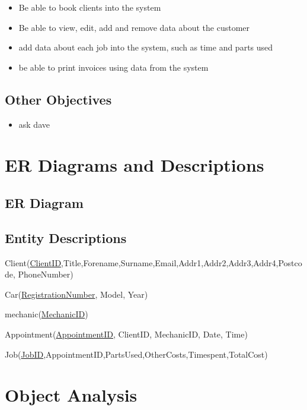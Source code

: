 	\begin{itemize}
	
	\item Be able to book clients into the system
	
	\item Be able to view, edit, add and remove data about the customer
	
	\item add data about each job into the system, such as time and parts used
	
	\item be able to print invoices	using data from the system 
	
	\end{itemize}

	\subsection{Other Objectives}	
	
	\begin{itemize}
	
	\item  ask dave
	
	\end{itemize}

\section{ER Diagrams and Descriptions}

	\subsection{ER Diagram}
	
	\subsection{Entity Descriptions}
	
	Client(\underline{ClientID},Title,Forename,Surname,Email,Addr1,Addr2,Addr3,Addr4,Postcode,
PhoneNumber)


Car(\underline{RegistrationNumber}, Model, Year)


mechanic(\underline{MechanicID})


Appointment(\underline{AppointmentID}, ClientID, MechanicID, Date, Time)


Job(\underline{JobID},AppointmentID,PartsUsed,OtherCosts,Timespent,TotalCost)


\section{Object Analysis}

